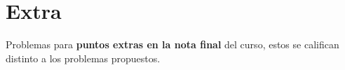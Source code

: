 \section{Extra}
Problemas para \textbf{puntos extras en la nota final} del curso, estos se califican distinto a los problemas propuestos.